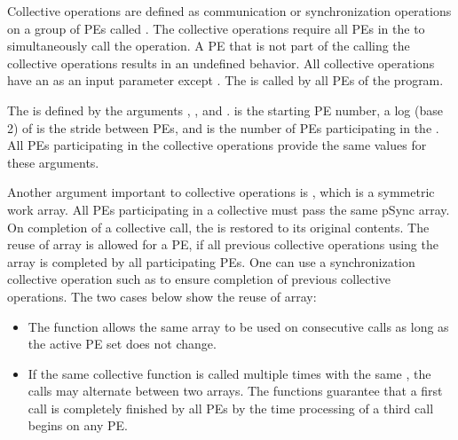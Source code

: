 
Collective operations are defined as communication or synchronization operations 
on a group of \ac{PE}s called \activeset{}. The collective operations require all
\ac{PE}s in the \activeset{} to simultaneously call the operation. 
A \ac{PE} that is not part of the \activeset{} calling the collective 
operations results in an undefined behavior. All
collective operations have an \activeset{} as an input parameter except \barrierall{}. The \barrierall{} is called by all \ac{PE}s of the \openshmem{}
program. 

The \activeset{} is defined by the arguments , , 
and .  is the starting \ac{PE} number, a log (base 2) of  
is the stride between \ac{PE}s, and  is the number of \ac{PE}s 
participating in the \activeset{}. All \ac{PE}s participating in the 
collective operations provide the same values for these arguments. 
 
Another argument important to collective operations is , which is a symmetric work 
array. All \ac{PE}s participating in a collective must pass the same
pSync array. On completion of a collective call, the  is restored to its 
original contents. The reuse of  array is allowed for a \ac{PE}, if all previous collective 
operations using the  array is completed by all participating 
\ac{PE}s. One can use a synchronization collective operation such as \barrier{}
to ensure completion of previous collective operations. The two cases below
show the reuse of  array:

\begin{itemize}
\item The  function allows the same  array to be used
          on consecutive calls as long as the active \ac{PE} set does not change.
\item  If the same collective function is called multiple times with the
          same \activeset, the calls may alternate between two  arrays.
          The \openshmem functions guarantee that a first call is completely finished by 
          all \ac{PE}s by the time processing of a third  call  begins  on
          any \ac{PE}.          
\end{itemize}


